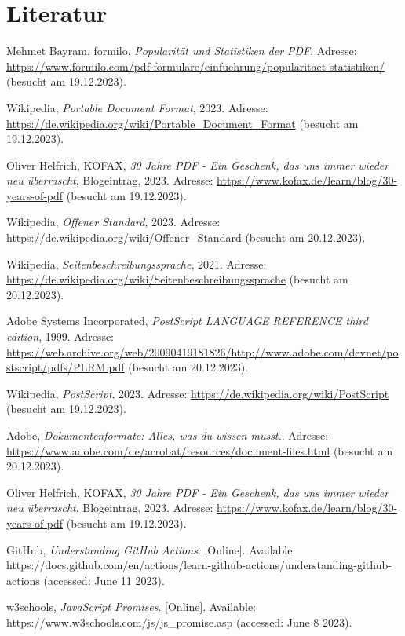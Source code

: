 \chapter*{Literatur}
\label{chap:literature}
%
\begin{referenceslist}
	\item Mehmet Bayram, formilo, \emph{Popularität und Statistiken der PDF}. Adresse: \url{https://www.formilo.com/pdf-formulare/einfuehrung/popularitaet-statistiken/} (besucht am 19.12.2023).
	
	\itema Wikipedia, \emph{Portable Document Format}, 2023. Adresse: \url{https://de.wikipedia.org/wiki/Portable_Document_Format} (besucht am 19.12.2023).
	
	\itemb Oliver Helfrich, KOFAX, \emph{30 Jahre PDF - Ein Geschenk, das uns immer wieder neu überrascht}, Blogeintrag, 2023. Adresse: \url{https://www.kofax.de/learn/blog/30-years-of-pdf} (besucht am 19.12.2023).
	
	\itemc Wikipedia, \emph{Offener Standard}, 2023. Adresse: \url{https://de.wikipedia.org/wiki/Offener_Standard} (besucht am 20.12.2023).
	
	\itemd Wikipedia, \emph{Seitenbeschreibungssprache}, 2021. Adresse: \url{https://de.wikipedia.org/wiki/Seitenbeschreibungssprache} (besucht am 20.12.2023). 
	
	\iteme Adobe Systems Incorporated, \emph{PostScript LANGUAGE REFERENCE third edition}, 1999. Adresse: \url{https://web.archive.org/web/20090419181826/http://www.adobe.com/devnet/postscript/pdfs/PLRM.pdf} (besucht am 20.12.2023).
	
	\itemf Wikipedia, \emph{PostScript}, 2023. Adresse: \url{https://de.wikipedia.org/wiki/PostScript} (besucht am 19.12.2023).
	
	\itemg Adobe, \emph{Dokumentenformate: Alles, was du wissen musst.}. Adresse: \url{https://www.adobe.com/de/acrobat/resources/document-files.html} (besucht am 20.12.2023).
	
	\itemh Oliver Helfrich, KOFAX, \emph{30 Jahre PDF - Ein Geschenk, das uns immer wieder neu überrascht}, Blogeintrag, 2023. Adresse: \url{https://www.kofax.de/learn/blog/30-years-of-pdf} (besucht am 19.12.2023).
	
	\itemi GitHub, \emph{Understanding GitHub Actions}. [Online]. Available: \\
	https://docs.github.com/en/actions/learn-github-actions/understanding-github-actions  (accessed: June 11 2023).
	
	\itemj w3schools, \emph{JavaScript Promises}. [Online]. Available: \\ 
	https://www.w3schools.com/js/js\_promise.asp (accessed: June 8 2023).
	

\end{referenceslist}
